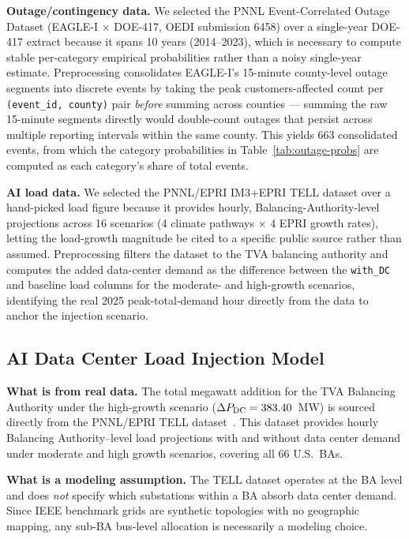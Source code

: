 \documentclass[11pt]{article}
\begin{document}
\textbf{Outage/contingency data.} We selected the PNNL Event-Correlated Outage Dataset (EAGLE-I $\times$ DOE-417, OEDI submission 6458) over a single-year DOE-417 extract because it spans 10 years (2014--2023), which is necessary to compute stable per-category empirical probabilities rather than a noisy single-year estimate. Preprocessing consolidates EAGLE-I's 15-minute county-level outage segments into discrete events by taking the peak customers-affected count per \texttt{(event\_id, county)} pair \emph{before} summing across counties --- summing the raw 15-minute segments directly would double-count outages that persist across multiple reporting intervals within the same county. This yields 663 consolidated events, from which the category probabilities in Table~\ref{tab:outage-probs} are computed as each category's share of total events.

\textbf{AI load data.} We selected the PNNL/EPRI IM3+EPRI TELL dataset over a hand-picked load figure because it provides hourly, Balancing-Authority-level projections across 16 scenarios (4 climate pathways $\times$ 4 EPRI growth rates), letting the load-growth magnitude be cited to a specific public source rather than assumed. Preprocessing filters the dataset to the TVA balancing authority and computes the added data-center demand as the difference between the \texttt{with\_DC} and baseline load columns for the moderate- and high-growth scenarios, identifying the real 2025 peak-total-demand hour directly from the data to anchor the injection scenario.

\subsection{AI Data Center Load Injection Model}
\textbf{What is from real data.}
The total megawatt addition for the TVA Balancing Authority under the high-growth scenario ($\Delta P_{\rm DC} = 383.40$~MW) is sourced directly from the PNNL/EPRI TELL dataset~\cite{pnnl_tell_2025}. This dataset provides hourly Balancing Authority--level load projections with and without data center demand under moderate and high growth scenarios, covering all 66 U.S.\ BAs.

\textbf{What is a modeling assumption.}
The TELL dataset operates at the BA level and does \emph{not} specify which substations within a BA absorb data center demand. Since IEEE benchmark grids are synthetic topologies with no geographic mapping, any sub-BA bus-level allocation is necessarily a modeling choice.
\end{document}
